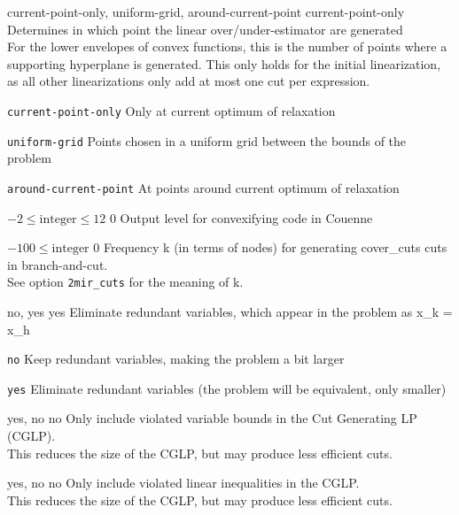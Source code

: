 %
{\ttfamily current-point-only, uniform-grid, around-current-point}%
{current-point-only}%
{Determines in which point the linear over/under-estimator are generated\\
For the lower envelopes of convex functions, this is the number of points where a supporting hyperplane is generated. This only holds for the initial linearization, as all other linearizations only add at most one cut per expression.}%
{\begin{list}{}{
\setlength{\parsep}{0em}
\setlength{\leftmargin}{5ex}
\setlength{\labelwidth}{2ex}
\setlength{\itemindent}{0ex}
\setlength{\topsep}{0pt}}
\item[\texttt{current-point-only}] Only at current optimum of relaxation
\item[\texttt{uniform-grid}] Points chosen in a uniform grid between the bounds of the problem
\item[\texttt{around-current-point}] At points around current optimum of relaxation
\end{list}
}

%
{$-2\leq\textrm{integer}\leq12$}%
{$0$}%
{Output level for convexifying code in Couenne}%
{}

%
{$-100\leq\textrm{integer}$}%
{$0$}%
{Frequency k (in terms of nodes) for generating cover\_cuts cuts in branch-and-cut.\\
See option \texttt{2mir\_cuts} for the meaning of k.}%
{}

%
{\ttfamily no, yes}%
{yes}%
{Eliminate redundant variables, which appear in the problem as x\_k = x\_h}%
{\begin{list}{}{
\setlength{\parsep}{0em}
\setlength{\leftmargin}{5ex}
\setlength{\labelwidth}{2ex}
\setlength{\itemindent}{0ex}
\setlength{\topsep}{0pt}}
\item[\texttt{no}] Keep redundant variables, making the problem a bit larger
\item[\texttt{yes}] Eliminate redundant variables (the problem will be equivalent, only smaller)
\end{list}
}

%
{\ttfamily yes, no}%
{no}%
{Only include violated variable bounds in the Cut Generating LP (CGLP).\\
This reduces the size of the CGLP, but may produce less efficient cuts.}%
{}

%
{\ttfamily yes, no}%
{no}%
{Only include violated linear inequalities in the CGLP.\\
This reduces the size of the CGLP, but may produce less efficient cuts.}%
{}

